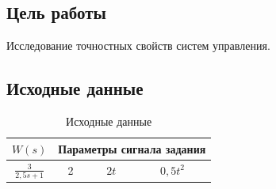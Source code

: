 \documentclass[a4paper, 11pt, russian]{article}
\begin{document}
    

    \subsection*{Цель работы}
    Исследование точностных свойств систем управления.
    \subsection*{Исходные данные}
    \begin{table}[ht!]
        \flushleft
        \caption{Исходные данные}
        \begin{tabular}{|c|c|c|c|}
            \hline
            $W(s)$ & \multicolumn{3}{c|}{Параметры сигнала задания} \\
            \hline
            $\displaystyle{\frac{3}{2,5s + 1}}$ & 2 & $2t$ & $0,5t^2$ \\
            \hline
        \end{tabular}
    \end{table}
    \clearpage
\end{document}
